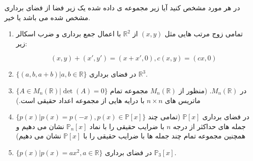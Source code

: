 \documentclass{article}
\begin{document}

در هر مورد مشخص کنید آیا زیر مجموعه ی داده شده یک زیر فضا از فضای برداری مشخص شده می باشد یا خیر.
\begin{enumerate}
	\item 
	تمامی زوج مرتب هایی مثل
	$(x,y)$
	از 
	$\mathbb{R}^2$
	با اعمال جمع برداری و ضرب اسکالر زیر:
	
	$$(x,y)+(x',y')=(x+x',0),c(x,y)=(cx,0)$$
	\item
	$\{(a,b,a+b)|a,b\in \mathbb{R}  \}$
	در فضای برداری 
	$\mathbb{R}^3$.
	\item
	$\{A\in M_n(\mathbb{R})|\det(A)=0\}$
	در
	$M_n(\mathbb{R})$.
	(منظور از 
	$M_n(\mathbb{R})$
	مجموعه تمام ماتریس های 
	$n\times n$
	با درایه هایی از مجموعه اعداد حقیقی است.)
	
	\item 
	$\{p(x)|p(x)=p(-x),p(x)\in\mathbb{P} [x]  \}$
	در فضای برداری 
	$\mathbb{P}[x]$
	(تمامی چند جمله های حداکثر از درجه 
	$n$
	با ضرایب حقیقی را با نماد  
	$\mathbb{P}_n[x]$
	نشان می دهیم و همچنین مجموعه تمام چند جمله ها با ضرایب حقیقی را با  
	$\mathbb{P}[x]$
	نشان می دهیم) 
	\item 
	$\{p(x)|p(x)=ax^2,a\in\mathbb{R}\}$
	در فضای برداری 
	$\mathbb{P}_3[x]$.
	
\end{enumerate}
\end{document}
